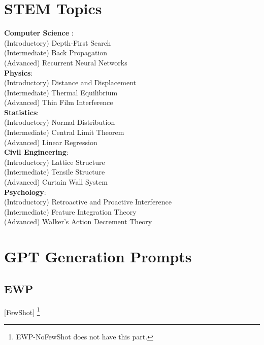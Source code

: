 \newpage
\section{STEM Topics}
\label{stem_topics}

\textbf{Computer Science }: \\
(Introductory)  Depth-First Search\\
(Intermediate)  Back Propagation \\
(Advanced)      Recurrent Neural Networks\\

\noindent\textbf{Physics}: \\
(Introductory)  Distance and Displacement\\
(Intermediate)  Thermal Equilibrium \\
(Advanced)      Thin Film Interference\\

\noindent \textbf{Statistics}: \\
(Introductory)  Normal Distribution\\
(Intermediate)  Central Limit Theorem \\
(Advanced)      Linear Regression\\

\noindent \textbf{Civil Engineering}: \\
(Introductory)  Lattice Structure\\
(Intermediate)  Tensile Structure \\
(Advanced)      Curtain Wall System\\

\noindent \textbf{Psychology}: \\
(Introductory)  Retroactive and Proactive Interference\\
(Intermediate)  Feature Integration Theory \\
(Advanced)      Walker's Action Decrement Theory\\


\section{GPT Generation Prompts}
\label{prompts}

\subsection{EWP}

[FewShot] \footnote{EWP-NoFewShot does not have this part.}\\

